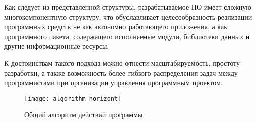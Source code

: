 \vspace{\baselineskip}
Как следует из представленной структуры, разрабатываемое ПО имеет сложную многокомпонентную структуру, что обуславливает целесообразность реализации программных средств не как автономно работающего приложения, а как программного пакета, содержащего исполняемые модули, библиотеки данных и другие информационные ресурсы.

\vspace{\baselineskip}
К достоинствам такого подхода можно отнести масштабируемость, простоту разработки, а также возможность более гибкого распределения задач между программистами при организации управления программным проектом.

\begin{landscape}
\begin{figure}[h!]
  \centering
  \texttt{[image: algorithm-horizont]}
  \caption{Общий алгоритм действий программы}
  \label{img:algorithm-horizont}
\end{figure}
\end{landscape}
\FloatBarrier